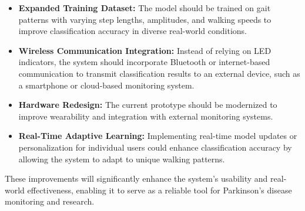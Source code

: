 \begin{itemize}
    \item \textbf{Expanded Training Dataset:} The model should be trained on gait patterns with varying step lengths, amplitudes, and walking speeds to improve classification accuracy in diverse real-world conditions.
    
    \item \textbf{Wireless Communication Integration:} Instead of relying on LED indicators, the system should incorporate Bluetooth or internet-based communication to transmit classification results to an external device, such as a smartphone or cloud-based monitoring system.
    
    \item \textbf{Hardware Redesign:} The current prototype should be modernized to improve wearability and integration with external monitoring systems.
    
    \item \textbf{Real-Time Adaptive Learning:} Implementing real-time model updates or personalization for individual users could enhance classification accuracy by allowing the system to adapt to unique walking patterns.
\end{itemize}




These improvements will significantly enhance the system’s usability and real-world effectiveness, enabling it to serve as a reliable tool for Parkinson’s disease monitoring and research.